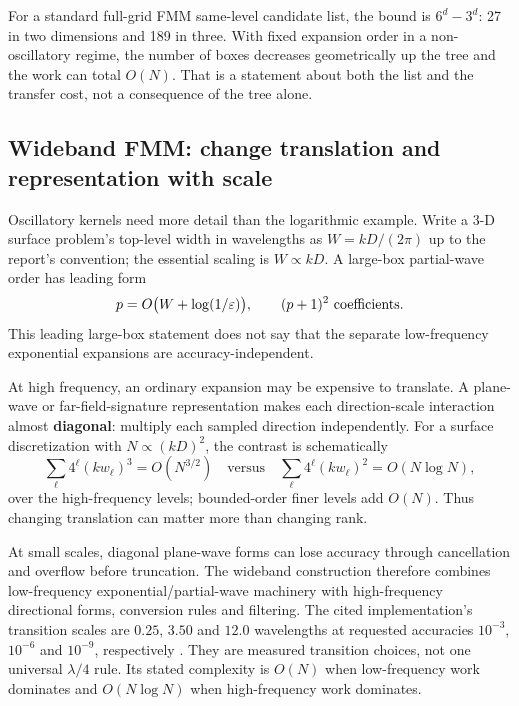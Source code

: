 For a standard full-grid FMM same-level candidate list, the bound is $6^d-3^d$: 27 in two dimensions and 189 in three. With fixed expansion order in a non-oscillatory regime, the number of boxes decreases geometrically up the tree and the work can total $O(N)$. That is a statement about both the list and the transfer cost, not a consequence of the tree alone.

\subsection{Wideband FMM: change translation and representation with scale}
\label{sec:wideband}
Oscillatory kernels need more detail than the logarithmic example. Write a 3-D surface problem's top-level width in wavelengths as $W=kD/(2\pi)$ up to the report's convention; the essential scaling is $W\propto kD$. A large-box partial-wave order has leading form
\begin{equation}
 p=O\big(W+\log(1/\eps)\big),\qquad (p+1)^2\ \text{coefficients}.
\end{equation}
This leading large-box statement does not say that the separate low-frequency exponential expansions are accuracy-independent.

At high frequency, an ordinary expansion may be expensive to translate. A plane-wave or far-field-signature representation makes each direction-scale interaction almost \textbf{diagonal}: multiply each sampled direction independently. For a surface discretization with $N\propto(kD)^2$, the contrast is schematically
\begin{equation}
 \sum_\ell4^\ell(kw_\ell)^3=O(N^{3/2})
 \quad\text{versus}\quad
 \sum_\ell4^\ell(kw_\ell)^2=O(N\log N),
 \label{eq:wideband-cost}
\end{equation}
over the high-frequency levels; bounded-order finer levels add $O(N)$. Thus changing translation can matter more than changing rank.

At small scales, diagonal plane-wave forms can lose accuracy through cancellation and overflow before truncation. The wideband construction therefore combines low-frequency exponential/partial-wave machinery with high-frequency directional forms, conversion rules and filtering. The cited implementation's transition scales are $0.25$, $3.50$ and $12.0$ wavelengths at requested accuracies $10^{-3}$, $10^{-6}$ and $10^{-9}$, respectively \cite{cheng2006wideband}. They are measured transition choices, not one universal $\lambda/4$ rule. Its stated complexity is $O(N)$ when low-frequency work dominates and $O(N\log N)$ when high-frequency work dominates.

